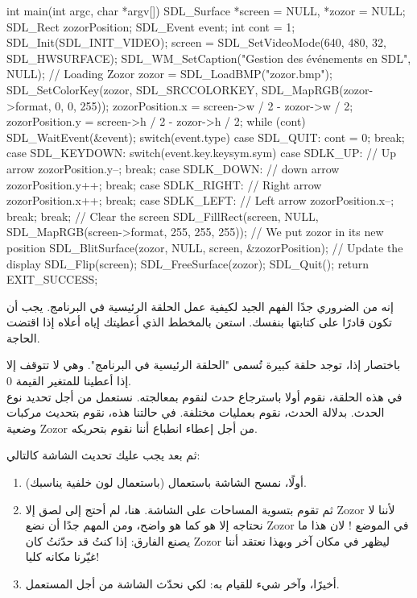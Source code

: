 \begin{Csource}
int main(int argc, char *argv[])
{
	SDL_Surface *screen = NULL, *zozor = NULL;
	SDL_Rect zozorPosition;
	SDL_Event event;
	int cont = 1;
	SDL_Init(SDL_INIT_VIDEO);
	screen = SDL_SetVideoMode(640, 480, 32, SDL_HWSURFACE);
	SDL_WM_SetCaption("Gestion des événements en SDL", NULL);
	// Loading Zozor
	zozor = SDL_LoadBMP("zozor.bmp");
	SDL_SetColorKey(zozor, SDL_SRCCOLORKEY, SDL_MapRGB(zozor->format, 0, 0, 255));
	zozorPosition.x = screen->w / 2 - zozor->w / 2;
	zozorPosition.y = screen->h / 2 - zozor->h / 2;
	while (cont)
	{
		SDL_WaitEvent(&event);
		switch(event.type)
		{
			case SDL_QUIT:
			cont = 0;
			break;
			case SDL_KEYDOWN:
			switch(event.key.keysym.sym)
			{
				case SDLK_UP: // Up arrow
				zozorPosition.y--;
				break;
				case SDLK_DOWN: // down arrow
				zozorPosition.y++;
				break;
				case SDLK_RIGHT: // Right arrow
				zozorPosition.x++;
				break;
				case SDLK_LEFT: // Left arrow
				zozorPosition.x--;
				break;
			}
			break;
		}
		// Clear the screen
		SDL_FillRect(screen, NULL, SDL_MapRGB(screen->format, 255, 255, 255));
		// We put zozor in its new position
		SDL_BlitSurface(zozor, NULL, screen, &zozorPosition);
		// Update the display
		SDL_Flip(screen);
	}
	SDL_FreeSurface(zozor);
	SDL_Quit();
	return EXIT_SUCCESS;
}
\end{Csource}

إنه من الضروري جدًا الفهم الجيد لكيفية عمل الحلقة الرئيسية في البرنامج. يجب أن تكون قادرًا على كتابتها بنفسك. استعن بالمخطط الذي أعطيتك إياه أعلاه إذا اقتضت الحاجة.

باختصار إذا، توجد حلقة كبيرة تُسمى "الحلقة الرئيسية في البرنامج". وهي لا تتوقف إلا إذا أعطينا للمتغير 
القيمة 0.\\
في هذه الحلقة، نقوم أولا باسترجاع حدث لنقوم بمعالجته. نستعمل 
من أجل تحديد نوع الحدث. بدلالة الحدث، نقوم بعمليات مختلفة. في حالتنا هذه، نقوم بتحديث مركبات وضعية
\textenglish{Zozor}
من أجل إعطاء انطباع أننا نقوم بتحريكه.

ثم بعد
يجب عليك تحديث الشاشة كالتالي:

\begin{enumerate}
	\item أولًا، نمسح الشاشة باستعمال
	(باستعمال لون خلفية يناسبك).
	\item ثم تقوم بتسوية المساحات على الشاشة. هنا، لم أحتج إلى لصق إلا
	\textenglish{Zozor}
	لأننا لا نحتاجه إلا هو كما هو واضح، ومن المهم جدًا أن نضع
	\textenglish{Zozor}
	في الموضع
	!
	لان هذا ما يصنع الفارق: إذا كنتُ قد حدّثتُ
	كان
	\textenglish{Zozor}
	ليظهر في مكان آخر وبهذا نعتقد أننا غيّرنا مكانه كليا!
	\item أخيرًا، وآخر شيء للقيام به:
	لكي نحدّث الشاشة من أجل المستعمل.
\end{enumerate}

